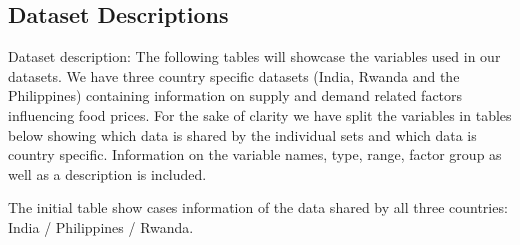 \documentclass[12pt,a4paper,english]{article}
\begin{document}
\subsection{Dataset Descriptions}

Dataset description: 
The following tables will showcase the variables used in our datasets. We have three country specific datasets (India, Rwanda and the Philippines) containing information on supply and demand related factors influencing food prices. For the sake of clarity we have split the variables in tables below showing which data is shared by the individual sets and which data is country specific. Information on the variable names, type, range, factor group as well as a description is included. 


The initial table show cases information of the data shared by all three countries: India / Philippines / Rwanda.
\FloatBarrier
\end{document}
